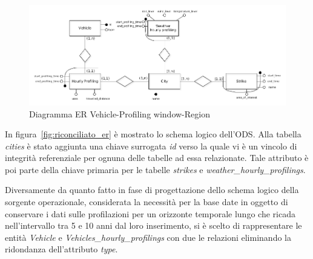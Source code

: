 \begin{figure}[H]                                                                                                                                                            
\centering                                                                                                                                                                   
\includegraphics[width=\textwidth]{diagrams/integrated_1_er}                                                                                                                                   
\caption{Diagramma ER Vehicle-Profiling window-Region}                                                                                                                                            
\label{fig:integrated_1_er}                                                                                                                                                           
\end{figure}

In figura~\ref{fig:riconciliato_er} è mostrato lo schema logico dell'ODS.
Alla tabella \textit{cities} è stato aggiunta una chiave surrogata \textit{id}
verso la quale vi è un vincolo di integrità referenziale per ognuna delle tabelle
ad essa relazionate. Tale attributo è poi parte della chiave primaria per le
tabelle \textit{strikes} e \textit{weather\_hourly\_profilings}.

Diversamente da quanto fatto in fase di progettazione dello schema logico della
sorgente operazionale, considerata la necessità per la base date in oggetto
di conservare i dati sulle profilazioni per un orizzonte temporale lungo che ricada
nell'intervallo tra 5 e 10 anni dal loro inserimento, si è scelto di rappresentare 
le entità \textit{Vehicle} e \textit{Vehicles\_hourly\_profilings} con due
le relazioni eliminando la ridondanza dell'attributo \textit{type}. 

